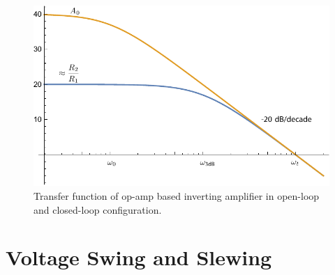 \begin{figure}[tb]
\begin{center}
\includegraphics[scale=1]{mag1pole_fb_label}
\end{center}
\caption{Transfer function of op-amp based inverting amplifier in open-loop and closed-loop configuration.}
\label{fig:mag1pole_fb_label}
\end{figure}
\section{Voltage Swing and Slewing }
